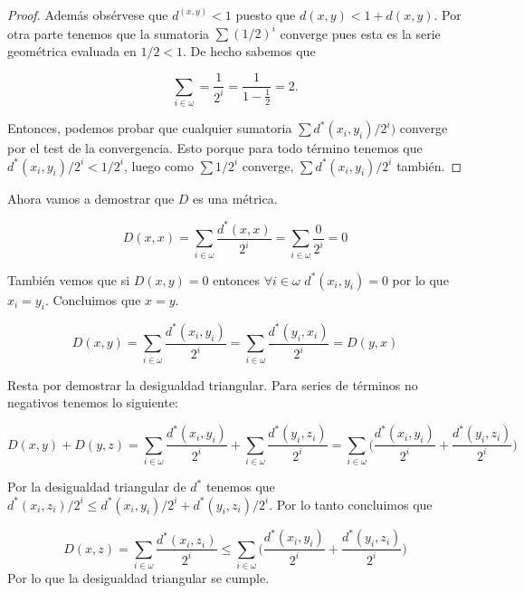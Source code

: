 \documentclass[letter,twoside,12pt]{article}
\begin{document}
\begin{enumerate}
\begin{proof}
Además obsérvese que $ d^(x,y)<1 $ puesto que $d(x,y)<1+d(x,y)$. Por otra parte tenemos que la sumatoria $ \sum {(1/2)^i} $ converge pues esta es la serie geométrica evaluada en $ 1/2<1 $. De hecho sabemos que

\begin{equation}
\sum_{i \in \omega} = \frac{1}{2^i}=\frac{1}{1-\frac{1}{2}}=2.\nonumber 
\end{equation}

Entonces, podemos probar que cualquier sumatoria $ \sum d^*(x_i,y_i)/2^i) $ converge por el test de la convergencia. Esto porque para todo término tenemos que $ d^*(x_i,y_i)/2^i<1/2^i $, luego como $ \sum 1/2^i$ converge, $ \sum d^*(x_i,y_i)/2^i $ también. 
\end{proof}

Ahora vamos a demostrar que $ D $ es una métrica.

\begin{equation}
D(x,x)= \sum_{i \in \omega} \frac{d^*(x,x)}{2^i}=\sum_{i \in \omega}\frac{0}{2^i}=0 \nonumber
\end{equation}

También vemos que si $D(x,y)=0$ entonces $ \forall i \in \omega $ $d^*(x_i,y_i)=0$ por lo que $x_i=y_i$. Concluimos que $ x = y $.

\begin{equation}
D(x,y)= \sum_{i \in \omega} \frac{d^*(x_i,y_i)}{2^i} = \sum_{i \in \omega} \frac{d^*(y_i,x_i)}{2^i} = D(y,x)\nonumber
\end{equation}

Resta por demostrar la desigualdad triangular. Para series de términos no negativos tenemos lo siguiente:

\begin{equation}
D(x,y)+D(y,z)=\sum_{i \in \omega} \frac{d^*(x_i,y_i)}{2^i} + \sum_{i \in \omega} \frac{d^*(y_i,z_i)}{2^i}= \sum_{i \in \omega} \Big(\frac{d^*(x_i,y_i)}{2^i}+\frac{d^*(y_i,z_i)}{2^i}\Big) \nonumber
\end{equation}

Por la desigualdad triangular de $ d^* $ tenemos que $ d^*(x_i,z_i)/2^i \leq d^*(x_i,y_i)/2^i+d^*(y_i,z_i)/2^i $. Por lo tanto concluimos que

\begin{equation}
D(x,z)=\sum_{i \in \omega} \frac{d^*(x_i,z_i)}{2^i} \leq \sum_{i \in \omega} \Big(\frac{d^*(x_i,y_i)}{2^i}+\frac{d^*(y_i,z_i)}{2^i}\Big) \nonumber
\end{equation}
Por lo que la desigualdad triangular se cumple. 


\end{enumerate}
\end{document}
